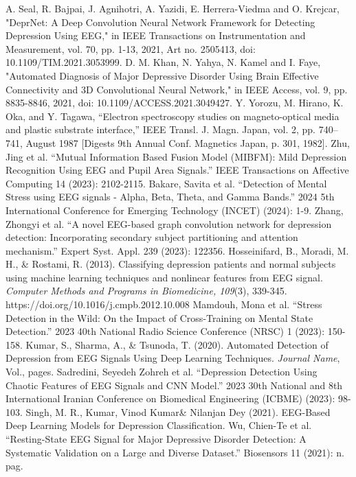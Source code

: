 \documentclass[conference]{IEEEtran}
\begin{document}
\begin{thebibliography}{00}
 A. Seal, R. Bajpai, J. Agnihotri, A. Yazidi, E. Herrera-Viedma and O. Krejcar, "DeprNet: A Deep Convolution Neural Network Framework for Detecting Depression Using EEG," in IEEE Transactions on Instrumentation and Measurement, vol. 70, pp. 1-13, 2021, Art no. 2505413, doi: 10.1109/TIM.2021.3053999. 
 D. M. Khan, N. Yahya, N. Kamel and I. Faye, "Automated Diagnosis of Major Depressive Disorder Using Brain Effective Connectivity and 3D Convolutional Neural Network," in IEEE Access, vol. 9, pp. 8835-8846, 2021, doi: 10.1109/ACCESS.2021.3049427. 
 Y. Yorozu, M. Hirano, K. Oka, and Y. Tagawa, ``Electron spectroscopy studies on magneto-optical media and plastic substrate interface,'' IEEE Transl. J. Magn. Japan, vol. 2, pp. 740--741, August 1987 [Digests 9th Annual Conf. Magnetics Japan, p. 301, 1982].
 Zhu, Jing et al. “Mutual Information Based Fusion Model (MIBFM): Mild Depression Recognition Using EEG and Pupil Area Signals.” IEEE Transactions on Affective Computing 14 (2023): 2102-2115.
 Bakare, Savita et al. “Detection of Mental Stress using EEG signals - Alpha, Beta, Theta, and Gamma Bands.” 2024 5th International Conference for Emerging Technology (INCET) (2024): 1-9.
 Zhang, Zhongyi et al. “A novel EEG-based graph convolution network for depression detection: Incorporating secondary subject partitioning and attention mechanism.” Expert Syst. Appl. 239 (2023): 122356.
 Hosseinifard, B., Moradi, M. H., \& Rostami, R. (2013). Classifying depression patients and normal subjects using machine learning techniques and nonlinear features from EEG signal. \textit{Computer Methods and Programs in Biomedicine, 109}(3), 339-345. https://doi.org/10.1016/j.cmpb.2012.10.008
 Mamdouh, Mona et al. “Stress Detection in the Wild: On the Impact of Cross-Training on Mental State Detection.” 2023 40th National Radio Science Conference (NRSC) 1 (2023): 150-158.
 Kumar, S., Sharma, A., \& Tsunoda, T. (2020). Automated Detection of Depression from EEG Signals Using Deep Learning Techniques. \textit{Journal Name}, Vol., pages.
 Sadredini, Seyedeh Zohreh et al. “Depression Detection Using Chaotic Features of EEG Signals and CNN Model.” 2023 30th National and 8th International Iranian Conference on Biomedical Engineering (ICBME) (2023): 98-103.
 Singh, M. R., Kumar, Vinod Kumar\& Nilanjan Dey (2021). EEG-Based Deep Learning Models for Depression Classification. 
 Wu, Chien-Te et al. “Resting-State EEG Signal for Major Depressive Disorder Detection: A Systematic Validation on a Large and Diverse Dataset.” Biosensors 11 (2021): n. pag.

\end{thebibliography}
\end{document}
